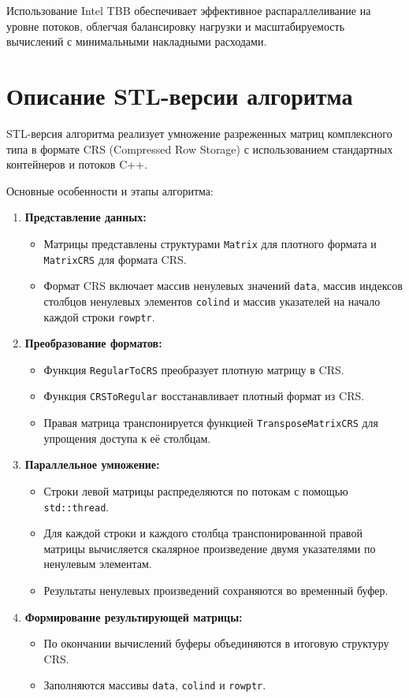 \documentclass[a4paper,12pt]{article}
\begin{document}
Использование Intel TBB обеспечивает эффективное распараллеливание на уровне потоков, облегчая балансировку нагрузки и масштабируемость вычислений с минимальными накладными расходами.

\newpage

\section{Описание STL-версии алгоритма}

STL-версия алгоритма реализует умножение разреженных матриц комплексного типа в формате CRS (Compressed Row Storage) с использованием стандартных контейнеров и потоков C++.

Основные особенности и этапы алгоритма:

\begin{enumerate}
  \item \textbf{Представление данных:}
  \begin{itemize}
    \item Матрицы представлены структурами \texttt{Matrix} для плотного формата и \texttt{MatrixCRS} для формата CRS.
    \item Формат CRS включает массив ненулевых значений \texttt{data}, массив индексов столбцов ненулевых элементов \texttt{colind} и массив указателей на начало каждой строки \texttt{rowptr}.
  \end{itemize}

  \item \textbf{Преобразование форматов:}
  \begin{itemize}
    \item Функция \texttt{RegularToCRS} преобразует плотную матрицу в CRS.
    \item Функция \texttt{CRSToRegular} восстанавливает плотный формат из CRS.
    \item Правая матрица транспонируется функцией \texttt{TransposeMatrixCRS} для упрощения доступа к её столбцам.
  \end{itemize}

  \item \textbf{Параллельное умножение:}
  \begin{itemize}
    \item Строки левой матрицы распределяются по потокам с помощью \texttt{std::thread}.
    \item Для каждой строки и каждого столбца транспонированной правой матрицы вычисляется скалярное произведение двумя указателями по ненулевым элементам.
    \item Результаты ненулевых произведений сохраняются во временный буфер.
  \end{itemize}

  \item \textbf{Формирование результирующей матрицы:}
  \begin{itemize}
    \item По окончании вычислений буферы объединяются в итоговую структуру CRS.
    \item Заполняются массивы \texttt{data}, \texttt{colind} и \texttt{rowptr}.
  \end{itemize}
\end{enumerate}
\end{document}
